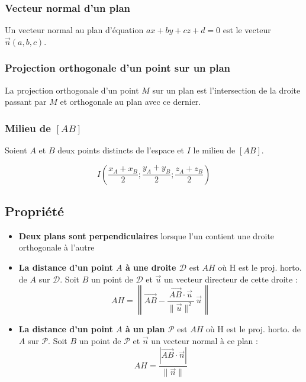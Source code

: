 \documentclass{report}
\newcommand{\vu}{\overrightarrow{u}}
\begin{document}
    \subsubsection{Vecteur normal d'un plan}
    Un vecteur normal au plan d'équation $ax + by + cz + d = 0$ est le vecteur $\overrightarrow{n} (a, b, c)$.

    \subsubsection{Projection orthogonale d'un point sur un plan}
    La projection orthogonale d'un point $M$ sur un plan est l'intersection de la droite passant par $M$ et orthogonale au plan avec ce dernier.


    \subsubsection{Milieu de $[AB]$}

      Soient $A$ et $B$ deux points distincts de l'espace et $I$ le milieu de $[AB]$.

      \[I \left(\frac{x_A+x_B}{2};\frac{y_A+y_B}{2};\frac{z_A+z_B}{2}\right)\]

    \subsection{Propriété}

      \begin{itemize}%
        \item \textbf{Deux plans sont perpendiculaires} lorsque l'un contient une droite orthogonale à l'autre
        \item \textbf{La distance d'un point $A$ à une droite $\mathcal{D}$} est $AH$ où H est le proj. horto. de $A$ sur $\mathcal{D}$. Soit $B$ un point de $\mathcal{D}$ et $\vu$ un vecteur directeur de cette droite : 
                \[
                    \boxed{AH = \left\lVert \overrightarrow{AB} - 
                    \frac{\overrightarrow{AB}\cdot \vu}{\lVert \vu \rVert^2}\,\vu \right\rVert}
                \]
        
        \item \textbf{La distance d'un point $A$ à un plan $\mathcal{P}$} est $AH$ où H est le proj. horto. de $A$ sur $\mathcal{P}$. Soit $B$ un point de $\mathcal{P}$ et $\overrightarrow{n}$ un vecteur normal à ce plan : 
                \[
                    \boxed{AH = \frac{|\overrightarrow{AB}\cdot \overrightarrow{n}|}{\lVert \overrightarrow{n} \rVert}}\]
      \end{itemize}
\end{document}
